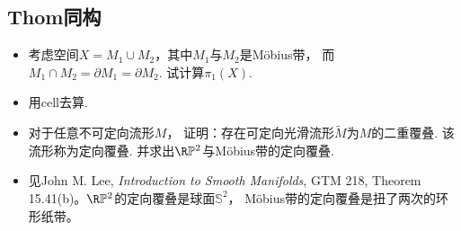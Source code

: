 \subsection{Thom同构}
\begin{itemize}
    \item[8.5] 考虑空间$X = M_{1} \cup M_{2}$，其中$M_{1}$与$M_{2}$是Möbius带，
               而$M_{1} \cap M_{2} = \partial M_{1} = \partial M_{2}$. 
               试计算$\pi_{1}(X)$.
    \item[\textbf{解：}] 用cell去算.

    \item[8.6] 对于任意不可定向流形$M$，
               证明：存在可定向光滑流形$\tilde{M}$为$M$的二重覆叠. 该流形称为定向覆叠.
               并求出$\R\mathbb{P}^{2}$与Möbius带的定向覆叠.
    \item[\textbf{解：}] 见John M. Lee, \textit{Introduction to Smooth Manifolds}, 
    GTM 218, Theorem 15.41(b)。$\R\mathbb{P}^{2}$的定向覆叠是球面$\mathbb{S}^2$，
    Möbius带的定向覆叠是扭了两次的环形纸带。
\end{itemize}

